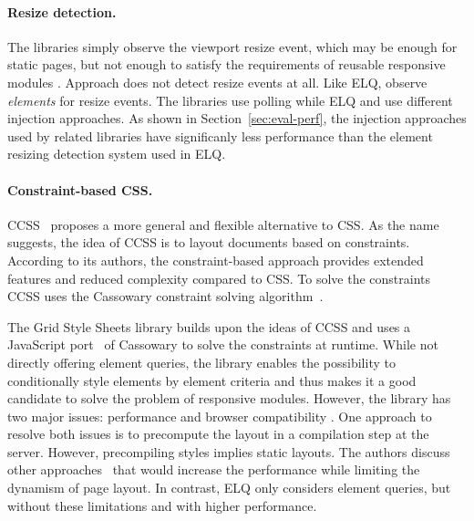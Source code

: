 \documentclass{llncs}
\newcommand{\elq}{ELQ}
\begin{document}
  \paragraph{Resize detection.}
  The libraries \cite{eq_imp_eqcss,eq_imp_breakpointsjs,eq_imp_mediaclass,eq_imp_elementquery,eq_imp_responsive-elements,eq_imp_sickles,eq_imp_responsive-elements-2,eq_imp_breaks2000,eq_imp_eqjs} simply observe the viewport resize event, which may be enough for static pages, but not enough to satisfy the requirements of reusable responsive modules \cite{elq-thesis}.
  Approach \cite{eq_imp_classquery} does not detect resize events at all.
  Like \elq{}, \cite{eq_imp_localised-css,eq_imp_selector_queries,eq_imp_prollyfill-min-width,eq_imp_gss,eq_imp_element-queries,eq_imp_css-element-queries} observe \emph{elements} for resize events.
  The libraries \cite{eq_imp_localised-css,eq_imp_selector_queries} use polling while \elq{} and \cite{eq_imp_prollyfill-min-width,eq_imp_gss,eq_imp_element-queries,eq_imp_css-element-queries} use different injection approaches.
  As shown in Section~\ref{sec:eval-perf}, the injection approaches used by related libraries have significanly less performance than the element resizing detection system used in \elq{}.

  \paragraph{Constraint-based CSS.}
  CCSS~\cite{badros1999constraint} proposes a more general and flexible alternative to CSS.
  As the name suggests, the idea of CCSS is to layout documents based on constraints.
  According to its authors, the constraint-based approach provides extended features and reduced complexity compared to CSS.
  To solve the constraints CCSS uses the Cassowary constraint solving algorithm~\cite{BadrosBS01}.

  The Grid Style Sheets library \cite{eq_imp_gss} builds upon the ideas of CCSS and uses a JavaScript port~\cite{cassowary_js} of Cassowary to solve the constraints at runtime.
  While not directly offering element queries, the library enables the possibility to conditionally style elements by element criteria and thus makes it a good candidate to solve the problem of responsive modules.
  However, the library has two major issues: performance and browser compatibility \cite{gss_issue}.
  One approach to resolve both issues is to precompute the layout in a compilation step at the server.
  However, precompiling styles implies static layouts.
  The authors discuss other approaches~\cite{gss_issue} that would increase the performance while limiting the dynamism of page layout.
  In contrast, \elq{} only considers element queries, but without these limitations and with higher performance.
\end{document}
